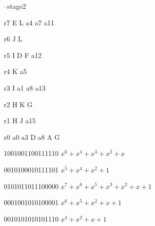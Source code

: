 \documentclass{article}
\begin{document}
--stage2 \par
r7 \longleftarrow E \oplus L \oplus a4 \oplus a7 \oplus a11 \par
r6 \longleftarrow J \oplus L \par
r5 \longleftarrow I \oplus D \oplus F \oplus a12 \par
r4 \longleftarrow K \oplus a5 \par
r3 \longleftarrow I \oplus a1 \oplus a8 \oplus a13 \par
r2 \longleftarrow H \oplus K \oplus G  \par
r1 \longleftarrow H \oplus J \oplus a15 \par
r0 \longleftarrow a0 \oplus a3 \oplus D \oplus a8 \oplus A \oplus G \par
\vspace{5mm}
\vspace{5mm}
1001001100111110  \equiv \(x^6 + x^4 + x^3 + x^2 + x\) \par
0010100010111101  \equiv \(x^5 + x^4 + x^2 + 1\) \par
0101011011100000  \equiv \(x^7 + x^6 + x^5 + x^3 + x^2 + x + 1\) \par
0001001010100001  \equiv \(x^6 + x^5 + x^2 + x + 1\) \par
0010101010101110  \equiv \(x^4 + x^2 + x + 1\) \par

\vspace{5mm}
\end{document}
